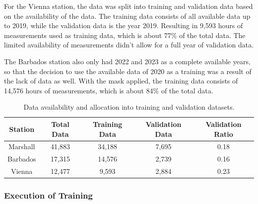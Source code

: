 For the Vienna station, the data was split into training and validation data based on the availability of the data. The training data consists of all available data up to 2019, while the validation data is the year 2019. Resulting in 9,593 hours of measurements used as training data, which is about 77\% of the total data. The limited availability of measurements didn't allow for a full year of validation data.

The Barbados station also only had 2022 and 2023 as a complete available years, so that the decision to use the available data of 2020 as a training was a result of the lack of data as well. With the mask applied, the training data consists of 14,576 hours of measurements, which is about 84\% of the total data.






\begin{table}
\centering
\begin{tabular}{|c|c|c|c|c|}
\hline
Station & Total Data & Training Data & Validation Data & Validation Ratio \\
\hline
Marshall & 41,883 & 34,188 & 7,695 & 0.18 \\
Barbados & 17,315 & 14,576 & 2,739 & 0.16 \\
Vienna & 12,477 & 9,593 & 2,884 & 0.23 \\
\hline
\end{tabular}
\caption{Data availability and allocation into training and validation datasets.}
\label{tab:data_split}
\end{table}

\subsubsection*{Execution of Training}

